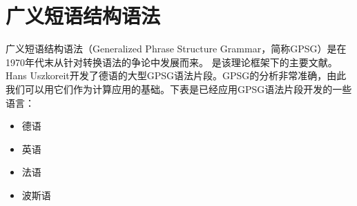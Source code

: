 
\chapter{广义短语结构语法}
\label{Kapitel-GPSG}

广义短语结构语法（Generalized Phrase Structure Grammar，简称GPSG）是在1970年代末从针对转换语法的争论中发展而来。 \citet*{GKPS85a}是该理论框架下的主要文献。Hans Uszkoreit开发了德语的大型GPSG语法片段\citeyearpar{Uszkoreit87a}。GPSG的分析非常准确，由此我们可以用它们作为计算应用的基础。下表是已经应用GPSG语法片段开发的一些语言：
\begin{itemize}
\item 德语 \citep{Weisweber87a-u,WP92b,Naumann87a-u,Naumann88-u-gekauft,Volk88}
\item 英语 \citep*{Evans85a-u,PT85a-u,Phillips92a-u,GCB93a-u}
\item 法语 \citep*{EdSB96a}
\item 波斯语 \citep*{BSM2011a}
\end{itemize}

